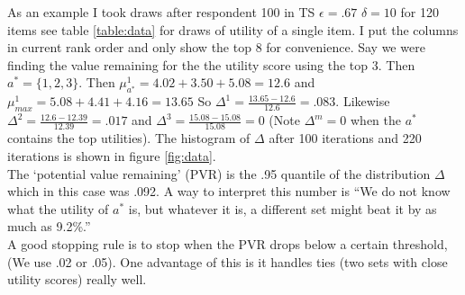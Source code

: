 \documentclass[12pt]{article}
\begin{document}
As an example I took draws after respondent 100 in TS $\epsilon=.67$ $\delta=10$ for 120 items see table \ref{table:data} for draws of utility of a single item. I put the columns in current rank order and only show the top 8 for convenience. Say we were finding the value remaining for the the utility score using the top 3. Then $a^*=\{1,2,3\}$. Then $\mu^1_{a^*}=4.02+3.50+5.08=12.6$ and $\mu_{max}^{1}=5.08+4.41+4.16=13.65$ So $\Delta^{1}=\frac{13.65-12.6}{12.6}=.083$. Likewise $\Delta^{2}=\frac{12.6-12.39}{12.39}=.017$ and $\Delta^{3}=\frac{15.08-15.08}{15.08}=0$ (Note $\Delta^m=0$ when the $a^*$ contains the top utilities). The histogram of $\Delta$ after 100 iterations and 220 iterations is shown in figure \ref{fig:data}. \\
 The `potential value remaining' (PVR) is the .95 quantile of the distribution $\Delta$ which in this case was .092. A way to interpret this number is ``We do not know what the utility of $a^*$ is, but whatever it is, a different set might beat it by as much as 9.2\%.''\\
 A good stopping rule is to stop when the PVR drops below a certain threshold, (We use .02 or .05). One advantage of this is it handles ties (two sets with close utility scores) really well. 

{}

\end{document}
